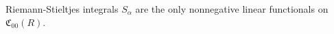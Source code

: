 Riemann-Stieltjes integrals $S_\alpha$ are the only nonnegative linear functionals on $\mathfrak{C}_{00}(R)$.